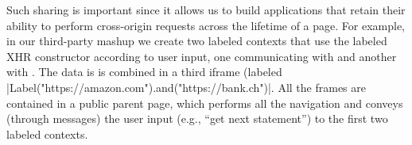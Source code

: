 Such sharing is important since it allows us to build applications
that retain their ability to perform cross-origin requests across the
lifetime of a page.
%
For example, in our third-party mashup we create two labeled contexts
that use the labeled XHR constructor according to user input, one
communicating with  and another with
.
%
The data is is combined in a third iframe (labeled
\js|Label("https://amazon.com").and("https://bank.ch")|.
%
All the frames are contained in a public parent page,
which performs all the navigation and conveys (through messages)
the user input (e.g., ``get next statement'') to the first two
labeled contexts.




